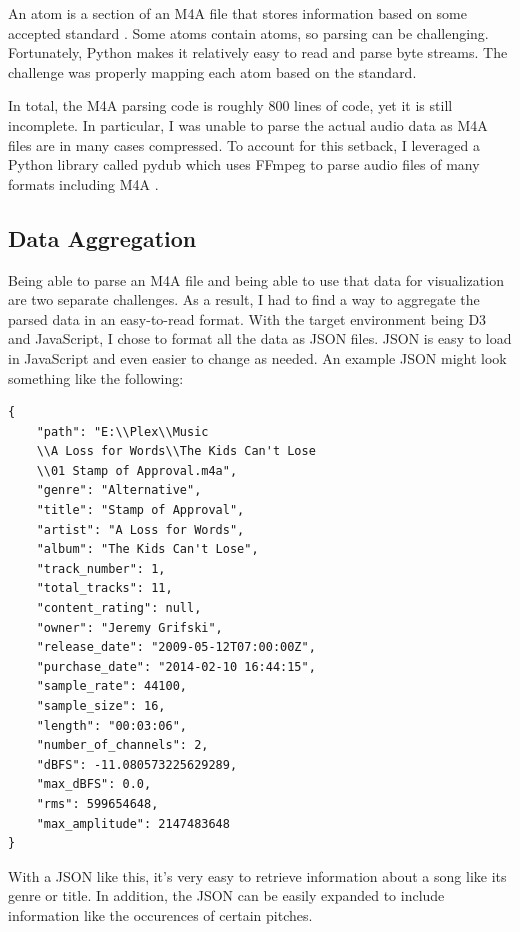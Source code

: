 \documentclass[journal]{vgtc}                %
\begin{document}
An atom is a section of an M4A file that stores information based on some accepted
standard \cite{Apple:2016:QuickTime}. Some atoms contain atoms, so parsing can
be challenging. Fortunately, Python makes it relatively easy to read and parse
byte streams. The challenge was properly mapping each atom based on the standard.

In total, the M4A parsing code is roughly 800 lines of code, yet it is still
incomplete. In particular, I was unable to parse the actual audio data as
M4A files are in many cases compressed. To account for this setback, I leveraged
a Python library called pydub which uses FFmpeg to parse audio files of many
formats including M4A \cite{Robert:2018:API}.

\subsection{Data Aggregation}

Being able to parse an M4A file and being able to use that data for visualization
are two separate challenges. As a result, I had to find a way to aggregate the
parsed data in an easy-to-read format. With the target environment being D3
and JavaScript, I chose to format all the data as JSON files. JSON is easy
to load in JavaScript and even easier to change as needed. An example JSON
might look something like the following:

\begin{verbatim}
{
    "path": "E:\\Plex\\Music
    \\A Loss for Words\\The Kids Can't Lose
    \\01 Stamp of Approval.m4a",
    "genre": "Alternative",
    "title": "Stamp of Approval",
    "artist": "A Loss for Words",
    "album": "The Kids Can't Lose",
    "track_number": 1,
    "total_tracks": 11,
    "content_rating": null,
    "owner": "Jeremy Grifski",
    "release_date": "2009-05-12T07:00:00Z",
    "purchase_date": "2014-02-10 16:44:15",
    "sample_rate": 44100,
    "sample_size": 16,
    "length": "00:03:06",
    "number_of_channels": 2,
    "dBFS": -11.080573225629289,
    "max_dBFS": 0.0,
    "rms": 599654648,
    "max_amplitude": 2147483648
}
\end{verbatim}

With a JSON like this, it's very easy to retrieve information about a song like
its genre or title. In addition, the JSON can be easily expanded to include
information like the occurences of certain pitches.
\end{document}
